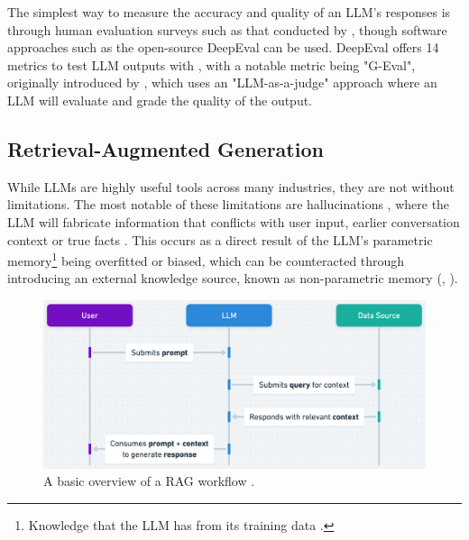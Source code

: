 \documentclass[12pt]{report}
\begin{document}
    The simplest way to measure the accuracy and quality of an LLM's responses is through human evaluation surveys such as that conducted by \textcite{ouyang_training_2022}, though
    software approaches such as the open-source DeepEval can be used. DeepEval offers 14 metrics to test LLM outputs with \autocite{deepeval_introduction_2024},
    with a notable metric being "G-Eval", originally introduced by \textcite{liu_g-eval_2023}, which uses an "LLM-as-a-judge" approach where an LLM will evaluate
    and grade the quality of the output.

    \subsection{Retrieval-Augmented Generation}
    
    While LLMs are highly useful tools across many industries, they are not without limitations. The most notable 
    of these limitations are hallucinations \autocite{lewis_retrieval-augmented_2021}, where the LLM will fabricate 
    information that conflicts with user input, earlier conversation context or true facts \autocite{zhang_sirens_2023}. This occurs as a direct result of the LLM's parametric memory\footnote{Knowledge that the LLM has from its training data \autocite{siriwardhana_improving_2023}.}
    being overfitted or biased, which can be counteracted through introducing an external knowledge source, known as non-parametric memory (\textcite{komeili_internet-augmented_2022}, \textcite{siriwardhana_improving_2023}).
    
    \begin{figure}[H] 
        \centering
        \includegraphics[width=.8\linewidth]{RAGProcess.png}
        \caption{A basic overview of a RAG workflow \autocite{openai_retrieval_nodate}.}
        \label{fig:RAGProcess}
    \end{figure}
\end{document}

